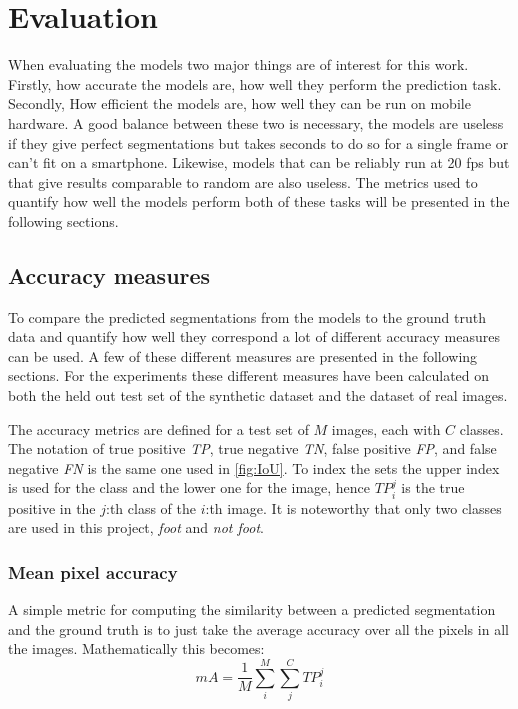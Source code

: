 \documentclass{kththesis}
\begin{document}
\section{Evaluation}
When evaluating the models two major things are of interest for this work.
Firstly, how accurate the models are, how well they perform the prediction task.
Secondly, How efficient the models are, how well they can be run on mobile
hardware. A good balance between these two is necessary, the models are useless
if they give perfect segmentations but takes seconds to do so for a single frame
or can't fit on a smartphone. Likewise, models that can be reliably run at 20
fps but that give results comparable to random are also useless. The metrics
used to quantify how well the models perform both of these tasks will be
presented in the following sections.

\subsection{Accuracy measures} \label{sec:accuracy}
To compare the predicted segmentations from the models to the ground truth data
and quantify how well they correspond a lot of different accuracy measures can
be used. A few of these different measures are presented in the following
sections. For the experiments these different measures have been calculated on
both the held out test set of the synthetic dataset and the dataset of real
images.

The accuracy metrics are defined for a test set of \(M\) images, each with \(C\)
classes. The notation of true positive \textit{TP}, true negative \textit{TN},
false positive \textit{FP}, and false negative \textit{FN} is the same one used
in \cref{fig:IoU}. To index the sets the upper index is used for the class and
the lower one for the image, hence \(\textit{TP}^j_i\) is the true positive in
the \(j\):th class of the \(i\):th image. It is noteworthy that only two
classes are used in this project, \textit{foot} and \textit{not foot}.
 
\subsubsection{Mean pixel accuracy}
A simple metric for computing the similarity between a predicted
segmentation and the ground truth is to just take the average accuracy over all
the pixels in all the images. Mathematically this becomes:
\[\textit{mA} = \frac{1}{M}\sum^M_i\sum^C_j\textit{TP}_i^j\]
\end{document}
